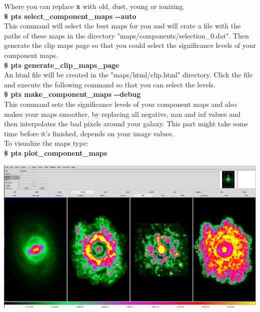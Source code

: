 \documentclass[15pt,a4paper,oneside,openright]{report}
\begin{document}
Where you can replace \textbf{x} with old, dust, young or ionizing.\\

\textbf{\$ pts select\_component\_maps -{}-auto}\\ 

This command will select the best maps for you and will crate a file with the paths of these maps in the directory "maps/components/selection\_0.dat". Then generate the clip maps page so that you could select the significance levels of your component maps.\\

\textbf{\$ pts generate\_clip\_maps\_page}\\

An html file will be created in the "maps/html/clip.html" directory. Click the file and execute the following command so that you can select the levels.\\

\textbf{\$ pts make\_component\_maps -{}-debug}\\ 

This command sets the significance levels of your component maps and also makes your maps smoother, by replacing all negative, nan and inf values and then interpolates the bad pixels around your galaxy. This part might take some time before it's finished, depends on your image values.\\

To visualize the maps type:\\

\textbf{\$ pts plot\_component\_maps}

\begin{center}
\includegraphics[width=1.0\textwidth]{figures/component_maps.png}
\end{center}
\end{document}
